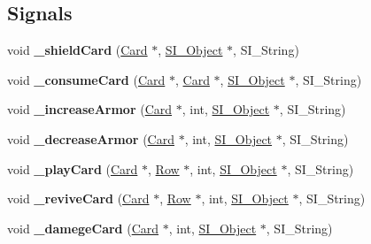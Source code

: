 \subsection*{Signals}
\begin{DoxyCompactItemize}
\item 
\mbox{\label{class_field_a91648a7d2c403f7bfa8c60041e4b22a4}} 
void {\bfseries \+\_\+shield\+Card} (\hyperlink{class_card}{Card} $\ast$, \hyperlink{class_s_i___object}{S\+I\+\_\+\+Object} $\ast$, S\+I\+\_\+\+String)
\item 
\mbox{\label{class_field_a49da8e4b70c4826c7d10ad63bcd4ff41}} 
void {\bfseries \+\_\+consume\+Card} (\hyperlink{class_card}{Card} $\ast$, \hyperlink{class_card}{Card} $\ast$, \hyperlink{class_s_i___object}{S\+I\+\_\+\+Object} $\ast$, S\+I\+\_\+\+String)
\item 
\mbox{\label{class_field_acd9ce61bcfd5820d79560b205e74e97e}} 
void {\bfseries \+\_\+increase\+Armor} (\hyperlink{class_card}{Card} $\ast$, int, \hyperlink{class_s_i___object}{S\+I\+\_\+\+Object} $\ast$, S\+I\+\_\+\+String)
\item 
\mbox{\label{class_field_a3ba396e91a84d207f7952f0feac88a2b}} 
void {\bfseries \+\_\+decrease\+Armor} (\hyperlink{class_card}{Card} $\ast$, int, \hyperlink{class_s_i___object}{S\+I\+\_\+\+Object} $\ast$, S\+I\+\_\+\+String)
\item 
\mbox{\label{class_field_a142081723866709b8ba4cebad95df75d}} 
void {\bfseries \+\_\+play\+Card} (\hyperlink{class_card}{Card} $\ast$, \hyperlink{class_card_set}{Row} $\ast$, int, \hyperlink{class_s_i___object}{S\+I\+\_\+\+Object} $\ast$, S\+I\+\_\+\+String)
\item 
\mbox{\label{class_field_a4a5629965ccfd136dacd43ed85660052}} 
void {\bfseries \+\_\+revive\+Card} (\hyperlink{class_card}{Card} $\ast$, \hyperlink{class_card_set}{Row} $\ast$, int, \hyperlink{class_s_i___object}{S\+I\+\_\+\+Object} $\ast$, S\+I\+\_\+\+String)
\item 
\mbox{\label{class_field_a282a44f7439500e63c82614b218b066e}} 
void {\bfseries \+\_\+damege\+Card} (\hyperlink{class_card}{Card} $\ast$, int, \hyperlink{class_s_i___object}{S\+I\+\_\+\+Object} $\ast$, S\+I\+\_\+\+String)

\end{DoxyCompactItemize}
